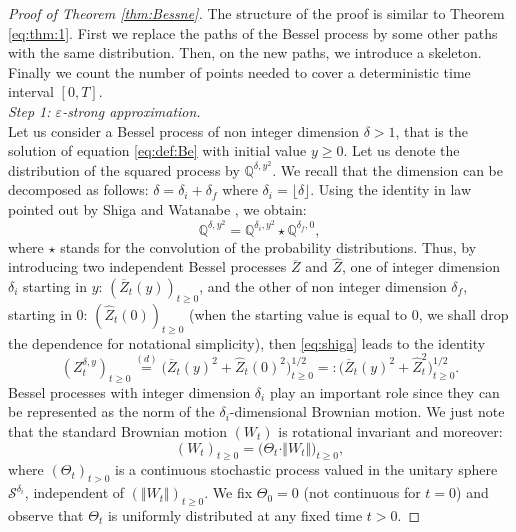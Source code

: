 \documentclass[12pt]{article}
\numberwithin{equation}{section}
\begin{document}
\begin{proof}[Proof of Theorem \ref{thm:Bessne}] The structure of the proof is similar to Theorem \ref{eq:thm:1}. First we replace the paths of the Bessel process by some other paths with the same distribution. Then, on the new paths, we introduce a skeleton. Finally we count the number of points needed to cover a deterministic time interval $[0,T]$.\\[5pt]
\noindent \emph{Step 1: $\varepsilon$-strong approximation.} \\[5pt]
Let us consider a Bessel process of non integer dimension $\delta>1$, that is the solution of equation \eqref{eq:def:Be} with initial value $y\ge 0$. Let us denote the distribution of the squared process by $\mathbb{Q}^{\delta,y^2}$. We recall that the dimension can be decomposed as follows:  $\delta=\delta_i+\delta_f$ where $\delta_i=\lfloor \delta\rfloor$. Using the identity in law pointed out by Shiga and Watanabe \cite{Shiga}, we obtain:
\begin{equation}
\mathbb{Q}^{\delta,y^2}=\mathbb{Q}^{\delta_i,y^2}\star \mathbb{Q}^{\delta_f,0},
\label{eq:shiga}
\end{equation}
where $\star$ stands for the convolution of the probability distributions. Thus, by introducing two independent Bessel processes $\overline{Z}$ and $\widehat{Z}$, one of integer dimension $\delta_i$ starting in $y$: $(\overline{Z}_t(y))_{t\ge 0}$, and the other of non integer dimension $\delta_f$, starting in $0$: $(\widehat{Z}_t(0))_{t\ge 0}$ (when the starting value is equal to $0$, we shall drop the dependence for notational simplicity), then \eqref{eq:shiga} leads to the identity
\begin{equation}
(Z^{\delta,y}_t)_{t\ge 0}\overset{(d)}{=}\Big(\overline{Z}_t(y)^2+\widehat{Z}_t(0)^2\Big)^{1/2}_{t\ge 0}=:\Big(\overline{Z}_t(y)^2+\widehat{Z}_t^2\Big)^{1/2}_{t\ge 0}.\label{eq:shiga2}
\end{equation}
Bessel processes with integer dimension $\delta_i$ play an important role since they can be represented as the norm of the $\delta_i$-dimensional Brownian motion. We just note that the standard Brownian motion  $(W_t)$ is rotational invariant and moreover:
\[
(W_t)_{t\ge 0}=\Big(\Theta_t\cdot\Vert W_t\Vert\Big)_{t\ge 0},
\]
where $(\Theta_t)_{t> 0}$ is a continuous stochastic process valued in the unitary sphere $\mathcal{S}^{\delta_i}$, independent of $(\Vert W_t\Vert)_{t\ge 0}$. We fix $\Theta_0=0$ (not continuous for $t=0$) and observe that $\Theta_t$ is uniformly distributed at any fixed time $t>0$. 


\end{proof}
\end{document}

